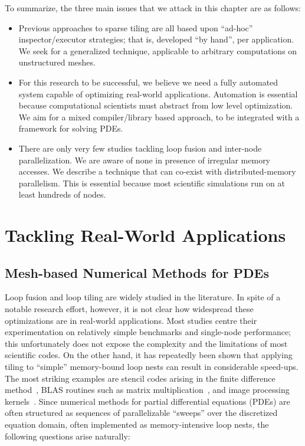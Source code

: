 To summarize, the three main issues that we attack in this chapter are as follows:

\begin{itemize}
\item Previous approaches to sparse tiling are all based upon ``ad-hoc'' inspector/executor strategies; that is, developed ``by hand'', per application. We seek for a generalized technique, applicable to arbitrary computations on unstructured meshes.
\item For this research to be successful, we believe we need a fully automated system capable of optimizing real-world applications. Automation is essential because computational scientists must abstract from low level optimization. We aim for a mixed compiler/library based approach, to be integrated with a framework for solving PDEs.
\item There are only very few studies tackling loop fusion and inter-node parallelization. We are aware of none in presence of irregular memory accesses. We describe a technique that can co-exist with distributed-memory parallelism. This is essential because most scientific simulations run on at least hundreds of nodes.
\end{itemize}



\section{Tackling Real-World Applications}
\label{sec:tiling:limits}

\subsection{Mesh-based Numerical Methods for PDEs}
Loop fusion and loop tiling are widely studied in the literature. In spite of a notable research effort, however, it is not clear how widespread these optimizations are in real-world applications. Most studies centre their experimentation on relatively simple benchmarks and single-node performance; this unfortunately does not expose the complexity and the limitations of most scientific codes. On the other hand, it has repeatedly been shown that applying tiling to ``simple'' memory-bound loop nests can result in considerable speed-ups. The most striking examples are stencil codes arising in the finite difference method~\cite{stencil-tiling}, BLAS routines such as matrix multiplication~\cite{MKL}, and image processing kernels~\cite{Halide}. Since numerical methods for partial differential equations (PDEs) are often structured as sequences of parallelizable ``sweeps'' over the discretized equation domain, often implemented as memory-intensive loop nests, the following questions arise naturally: 

